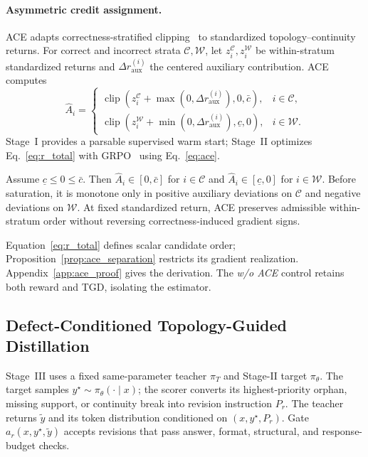 \paragraph{Asymmetric credit assignment.}
ACE adapts correctness-stratified clipping~\citep{liu2026graph} to standardized topology--continuity returns. For correct and incorrect strata $\mathcal{C},\mathcal{W}$, let $z_i^{\mathcal C},z_i^{\mathcal W}$ be within-stratum standardized returns and $\Delta r_{\mathrm{aux}}^{(i)}$ the centered auxiliary contribution. ACE computes
\begin{equation}
\label{eq:ace}
\widehat A_i=
\begin{cases}
\operatorname{clip}\!\left(z_i^{\mathcal C}+\max(0,\Delta r_{\mathrm{aux}}^{(i)}),0,\bar c\right), & i\in\mathcal C,\\
\operatorname{clip}\!\left(z_i^{\mathcal W}+\min(0,\Delta r_{\mathrm{aux}}^{(i)}),\underline c,0\right), & i\in\mathcal W.
\end{cases}
\end{equation}
Stage~I provides a parsable supervised warm start; Stage~II optimizes Eq.~\ref{eq:r_total} with GRPO~\citep{shao2024deepseekmath} using Eq.~\ref{eq:ace}.

\begin{proposition}
\label{prop:ace_separation}
Assume $\underline c\leq0\leq\bar c$. Then $\widehat A_i\in[0,\bar c]$ for $i\in\mathcal C$ and $\widehat A_i\in[\underline c,0]$ for $i\in\mathcal W$. Before saturation, it is monotone only in positive auxiliary deviations on $\mathcal C$ and negative deviations on $\mathcal W$. At fixed standardized return, ACE preserves admissible within-stratum order without reversing correctness-induced gradient signs.
\end{proposition}

Equation~\ref{eq:r_total} defines scalar candidate order; Proposition~\ref{prop:ace_separation} restricts its gradient realization. Appendix~\ref{app:ace_proof} gives the derivation. The \emph{w/o ACE} control retains both reward and TGD, isolating the estimator.

\subsection{Defect-Conditioned Topology-Guided Distillation}
\label{sec:distillation}

Stage~III uses a fixed same-parameter teacher $\pi_T$ and Stage-II target $\pi_\theta$. The target samples $y^{\star}\sim\pi_\theta(\cdot\mid x)$; the scorer converts its highest-priority orphan, missing support, or continuity break into revision instruction $P_r$. The teacher returns $\widetilde y$ and its token distribution conditioned on $(x,y^{\star},P_r)$. Gate $a_r(x,y^{\star},\widetilde y)$ accepts revisions that pass answer, format, structural, and response-budget checks.


